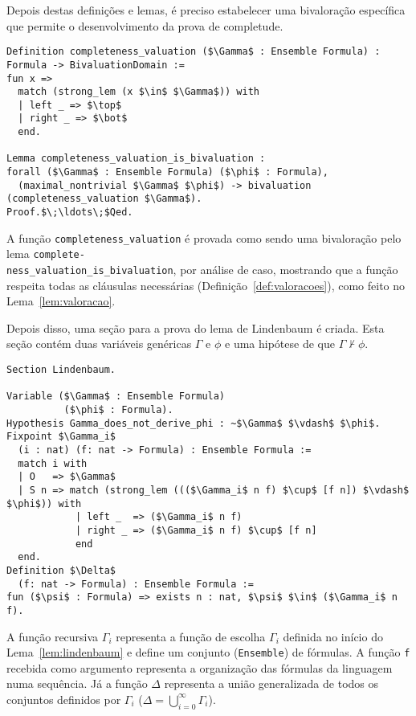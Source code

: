         Depois destas definições e lemas, é preciso estabelecer uma bivaloração específica que permite o desenvolvimento da prova de completude.
        
        \begin{lstlisting}[name=Completeness, frame=single, language=coq]
Definition completeness_valuation ($\Gamma$ : Ensemble Formula) : 
Formula -> BivaluationDomain :=
fun x =>
  match (strong_lem (x $\in$ $\Gamma$)) with
  | left _ => $\top$
  | right _ => $\bot$
  end.

Lemma completeness_valuation_is_bivaluation : 
forall ($\Gamma$ : Ensemble Formula) ($\phi$ : Formula), 
  (maximal_nontrivial $\Gamma$ $\phi$) -> bivaluation (completeness_valuation $\Gamma$).
Proof.$\;\ldots\;$Qed.
        \end{lstlisting}

        A função \texttt{completeness\_valuation} é provada como sendo uma bivaloração pelo lema \texttt{complete-\\ness\_valuation\_is\_bivaluation}, por análise de caso, mostrando que a função respeita todas as cláusulas necessárias (Definição~\ref{def:valoracoes}), como feito no Lema~\ref{lem:valoracao}.
    
        Depois disso, uma seção para a prova do lema de Lindenbaum é criada. Esta seção contém duas variáveis genéricas $\Gamma$ e $\phi$ e uma hipótese de que $\Gamma \nvdash \phi$.

        \begin{lstlisting}[name=Completeness, frame=single, language=coq]
Section Lindenbaum.

Variable ($\Gamma$ : Ensemble Formula)
          ($\phi$ : Formula).
Hypothesis Gamma_does_not_derive_phi : ~$\Gamma$ $\vdash$ $\phi$.
Fixpoint $\Gamma_i$ 
  (i : nat) (f: nat -> Formula) : Ensemble Formula :=
  match i with
  | O   => $\Gamma$
  | S n => match (strong_lem ((($\Gamma_i$ n f) $\cup$ [f n]) $\vdash$ $\phi$)) with
            | left _  => ($\Gamma_i$ n f)
            | right _ => ($\Gamma_i$ n f) $\cup$ [f n]
            end
  end.
Definition $\Delta$
  (f: nat -> Formula) : Ensemble Formula :=
fun ($\psi$ : Formula) => exists n : nat, $\psi$ $\in$ ($\Gamma_i$ n f).

        \end{lstlisting}

        A função recursiva \texttt{$\Gamma_i$} representa a função de escolha $\Gamma_i$ definida no início do Lema~\ref{lem:lindenbaum} e define um conjunto (\texttt{Ensemble}) de fórmulas. A função \texttt{f} recebida como argumento representa a organização das fórmulas da linguagem numa sequência. Já a função \texttt{$\Delta$} representa a união generalizada de todos os conjuntos definidos por \texttt{$\Gamma_i$} ($\Delta = \bigcup_{i=0}^{\infty}\Gamma_i$). 

